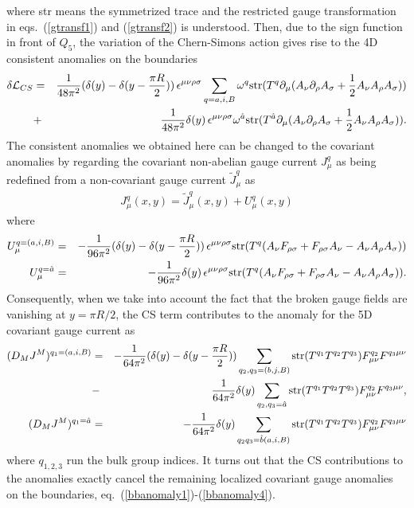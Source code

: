 \documentclass[a4paper,12pt]{article}
\begin{document}
where str means the symmetrized trace and the restricted gauge transformation
in eqs.~(\ref{gtransf1}) and (\ref{gtransf2}) is understood. 
Then, due to the sign function in front of $Q_5$, the variation 
of the Chern-Simons action gives rise to the 4D consistent anomalies on the 
boundaries
\begin{eqnarray}
\delta {\cal L}_{CS}&=&\frac{1}{48\pi^2}(\delta(y)-\delta(y-\frac{\pi R}{2}))
\,\epsilon^{\mu\nu\rho\sigma}\sum_{q=a,i,B}\omega^q{\rm str}(T^q\partial_\mu
(A_\nu\partial_\rho A_\sigma+\frac{1}{2}A_\nu A_\rho A_\sigma)) 
\nonumber \\
&+&\frac{1}{48\pi^2}\delta(y)\,\epsilon^{\mu\nu\rho\sigma}
\omega^{\hat a}{\rm str}
(T^{\hat a}\partial_\mu
(A_\nu\partial_\rho A_\sigma+\frac{1}{2}A_\nu A_\rho A_\sigma)).
\end{eqnarray} 
The consistent anomalies we obtained here can be changed to the covariant 
anomalies\cite{bardeen} by regarding the covariant non-abelian gauge current 
$J^q_\mu$ as being redefined from a non-covariant gauge current 
${\tilde J}^q_\mu$ as
\begin{eqnarray}
J^q_\mu(x,y)={\tilde J}^q_\mu(x,y)+U^q_\mu(x,y)
\end{eqnarray}
where 
\begin{eqnarray}
U^{q=(a,i,B)}_\mu&=&-\frac{1}{96\pi^2}(\delta(y)-\delta(y-\frac{\pi R}{2}))
\,\epsilon^{\mu\nu\rho\sigma}{\rm str}(T^q(A_\nu F_{\rho\sigma}
+F_{\rho\sigma}A_\nu-A_\nu A_\rho A_\sigma)) \nonumber \\
U^{q={\hat a}}_\mu&=&-\frac{1}{96\pi^2}\delta(y)
\,\epsilon^{\mu\nu\rho\sigma}{\rm str}(T^q(A_\nu F_{\rho\sigma}
+F_{\rho\sigma}A_\nu-A_\nu A_\rho A_\sigma)).
\end{eqnarray}
Consequently, when we take into account the fact that the broken gauge fields
are vanishing at $y=\pi R/2$, the CS term contributes to the anomaly for the 
5D covariant gauge current as 
\begin{eqnarray}
(D_M J^M)^{q_1=(a,i,B)}
&=&-\frac{1}{64\pi^2}(\delta(y)-\delta(y-\frac{\pi R}{2}))
\sum_{q_2,q_3=(b,j,B)}{\rm str}(T^{q_1}T^{q_2}T^{q_3})
F^{q_2}_{\mu\nu}F^{q_3\mu\nu}\nonumber \\
&-&\frac{1}{64\pi^2}\delta(y)
\sum_{q_2,q_3={\hat a}}{\rm str}(T^{q_1}T^{q_2}T^{q_3})
F^{q_2}_{\mu\nu}F^{q_3\mu\nu}, \label{csanomaly1}\\
(D_M J^M)^{q_1={\hat a}}&=&-\frac{1}{64\pi^2}\delta(y)
\sum_{q_2q_3={\hat b}(a,i,B)}{\rm str}(T^{q_1}T^{q_2}T^{q_3})
F^{q_2}_{\mu\nu}F^{q_3\mu\nu}\label{csanomaly2}
\end{eqnarray}
where $q_{1,2,3}$ run the bulk group indices.
It turns out that the CS contributions to the anomalies exactly cancel the 
remaining localized covariant gauge anomalies on the boundaries, 
eq.~(\ref{bbanomaly1})-(\ref{bbanomaly4}). 
\end{document}
